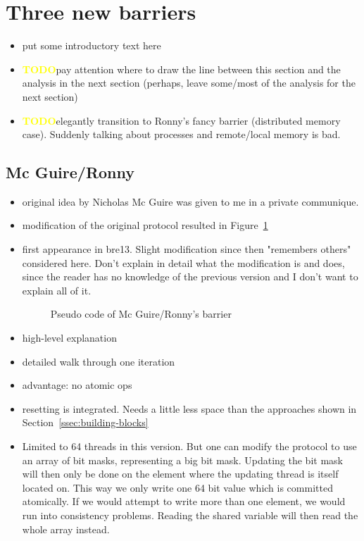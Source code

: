 \documentclass[a4paper, 10pt]{article}
\def \todo{\textbf{\textcolor{yellow}{TODO}}}
\begin{document}
\section{Three new barriers}
\label{sec:new}
\begin{itemize}
	\item put some introductory text here
	\item \todo pay attention where to draw the line between this section and the analysis in the next section (perhaps, leave some/most of the analysis for the next section)
	\item \todo elegantly transition to Ronny's fancy barrier (distributed memory case). Suddenly talking about processes and remote/local memory is bad.
\end{itemize}
\subsection{Mc Guire/Ronny}
\label{ssec:new-nmg}
\begin{itemize}
	\item original idea by Nicholas Mc Guire was given to me in a private communique.
	\item modification of the original protocol resulted in Figure~\ref{fig:pseudo-code-nmg-ronny}
	\item first appearance in bre13\cite{bre13}. Slight modification since then "remembers others" considered here. Don't explain in detail what the modification is and does, since the reader has no knowledge of the previous version and I don't want to explain all of it.
		\begin{figure}[htbp]
			\centering
			
			\caption{Pseudo code of Mc Guire/Ronny's barrier}
			\label{fig:pseudo-code-nmg-ronny}
		\end{figure}
	\item high-level explanation
	\item detailed walk through one iteration
	\item advantage: no atomic ops
	\item resetting is integrated. Needs a little less space than the approaches shown in Section~\ref{ssec:building-blocks}
	\item Limited to 64 threads in this version. But one can modify the protocol to use an array of bit masks, representing a big bit mask. Updating the bit mask will then only be done on the element where the updating thread is itself located on. This way we only write one 64 bit value which is committed atomically. If we would attempt to write more than one element, we would run into consistency problems. Reading the shared variable will then read the whole array instead.
\end{itemize}
\end{document}
